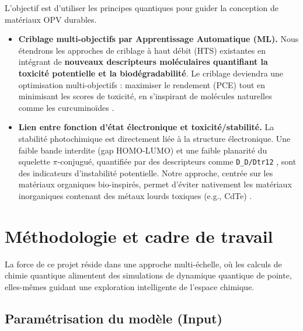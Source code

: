 \documentclass[12pt, a4paper]{article}
\begin{document}
L'objectif est d'utiliser les principes quantiques pour guider la conception de matériaux OPV durables.
\begin{itemize}
    \item \textbf{Criblage multi-objectifs par Apprentissage Automatique (ML).} Nous étendrons les approches de criblage à haut débit (HTS) existantes \cite{liu2022, choudhary2019} en intégrant de \textbf{nouveaux descripteurs moléculaires quantifiant la toxicité potentielle et la biodégradabilité}. Le criblage deviendra une optimisation multi-objectifs : maximiser le rendement (PCE) tout en minimisant les scores de toxicité, en s'inspirant de molécules naturelles comme les curcuminoïdes \cite{archet2018}.

    \item \textbf{Lien entre fonction d'état électronique et toxicité/stabilité.} La stabilité photochimique est directement liée à la structure électronique. Une faible bande interdite (gap HOMO-LUMO) et une faible planarité du squelette $\pi$-conjugué, quantifiée par des descripteurs comme \texttt{D\_D/Dtr12} \cite{liu2022}, sont des indicateurs d'instabilité potentielle. Notre approche, centrée sur les matériaux organiques bio-inspirés, permet d'éviter nativement les matériaux inorganiques contenant des métaux lourds toxiques (e.g., CdTe) \cite{archet2018, leb2016}.
\end{itemize}


\section{Méthodologie et cadre de travail}

La force de ce projet réside dans une approche multi-échelle, où les calculs de chimie quantique alimentent des simulations de dynamique quantique de pointe, elles-mêmes guidant une exploration intelligente de l'espace chimique.

\subsection{Paramétrisation du modèle (Input)}
\end{document}
